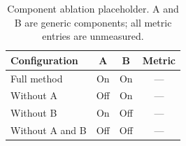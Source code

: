 \begin{table}[!t]
  \centering
  \caption{Component ablation placeholder. A and B are generic components;
  all metric entries are unmeasured.}
  \label{tab:component_ablation}
  \begin{tabular}{lccc}
    \toprule
    Configuration & A & B & Metric \\
    \midrule
    Full method & On & On & --- \\
    Without A & Off & On & --- \\
    Without B & On & Off & --- \\
    Without A and B & Off & Off & --- \\
    \bottomrule
  \end{tabular}
\end{table}
